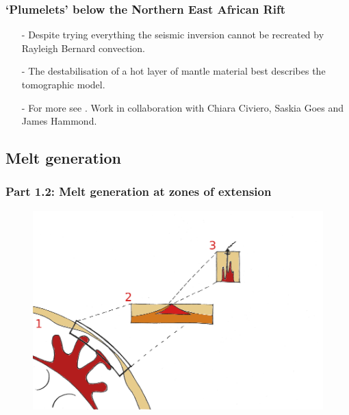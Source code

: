 \documentclass[aspectratio=169]{beamer}
\begin{document}
\begin{frame}
    \frametitle{`Plumelets' below the Northern East African Rift}
    \begin{itemize}
    \item[-]{Despite trying everything the seismic inversion cannot be recreated by Rayleigh Bernard convection.}
    \item[-]{The destabilisation of a hot layer of mantle material best describes the tomographic model.}
    \item[-]{For more see \cite{civiero-etal-2020}. Work in collaboration with Chiara Civiero, Saskia Goes and James Hammond.}
    \end{itemize}
\end{frame}

\subsection{Melt generation}

\begin{frame}
    \frametitle{Part 1.2: Melt generation at zones of extension}
    \begin{figure}
        \includegraphics[height=0.9\paperheight]{./pictures/drawing.png}
    \end{figure}
\end{frame}
\end{document}
